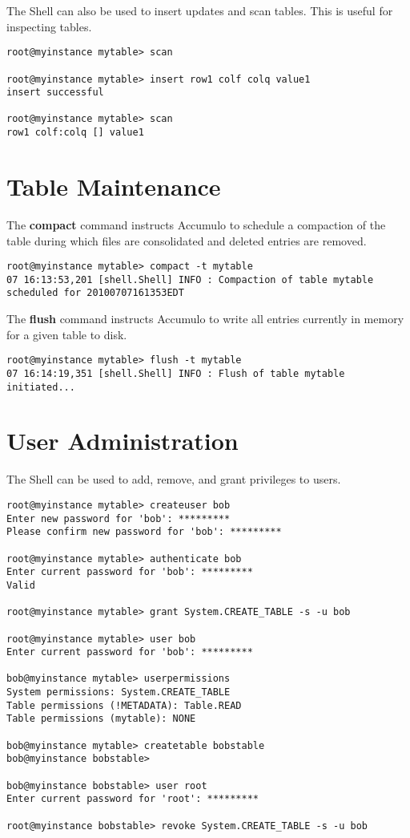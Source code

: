 The Shell can also be used to insert updates and scan tables. This is useful for
inspecting tables.

\small
\begin{verbatim}
root@myinstance mytable> scan

root@myinstance mytable> insert row1 colf colq value1
insert successful

root@myinstance mytable> scan
row1 colf:colq [] value1
\end{verbatim}
\normalsize

\section{Table Maintenance}

The \textbf{compact} command instructs Accumulo to schedule a compaction of the table during which
files are consolidated and deleted entries are removed.

\small
\begin{verbatim}
root@myinstance mytable> compact -t mytable
07 16:13:53,201 [shell.Shell] INFO : Compaction of table mytable
scheduled for 20100707161353EDT
\end{verbatim}
\normalsize

The \textbf{flush} command instructs Accumulo to write all entries currently in memory for a given table
to disk.

\small
\begin{verbatim}
root@myinstance mytable> flush -t mytable
07 16:14:19,351 [shell.Shell] INFO : Flush of table mytable
initiated...
\end{verbatim}
\normalsize

\section{User Administration}

The Shell can be used to add, remove, and grant privileges to users.

\small
\begin{verbatim}
root@myinstance mytable> createuser bob
Enter new password for 'bob': *********
Please confirm new password for 'bob': *********

root@myinstance mytable> authenticate bob
Enter current password for 'bob': *********
Valid

root@myinstance mytable> grant System.CREATE_TABLE -s -u bob

root@myinstance mytable> user bob
Enter current password for 'bob': *********

bob@myinstance mytable> userpermissions
System permissions: System.CREATE_TABLE
Table permissions (!METADATA): Table.READ
Table permissions (mytable): NONE

bob@myinstance mytable> createtable bobstable
bob@myinstance bobstable>

bob@myinstance bobstable> user root
Enter current password for 'root': *********

root@myinstance bobstable> revoke System.CREATE_TABLE -s -u bob
\end{verbatim}
\normalsize

